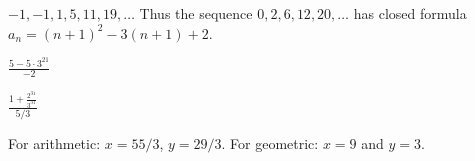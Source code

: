\documentclass[11pt]{exam}
\begin{document}
\begin{questions}
\question $-1, -1, 1, 5, 11, 19,\ldots$  Thus the sequence $0, 2, 6, 12, 20,\ldots$ has closed formula $a_n = (n+1)^2 - 3(n+1) + 2$.

\question %

\question %


\question $\frac{5-5\cdot 3^{21}}{-2}$

\question $\frac{1 + \frac{2^{31}}{3^{31}}}{5/3}$

\question For arithmetic: $x = 55/3$, $y = 29/3$.  For geometric: $x = 9$ and $y = 3$.


\end{questions}
\end{document}
